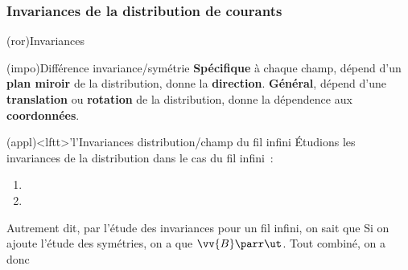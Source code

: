 \documentclass[../../main/main.tex]{subfiles}
\begin{document}
\subsubsection{Invariances de la distribution de courants}
\label{sssec:invdist}
\begin{tcb*}(ror){Invariances}
	\begin{center}
	\end{center}
\end{tcb*}

\begin{tcb*}[sidebyside, sidebyside align=top](impo){Différence invariance/symétrie}
		\textbf{Spécifique} à chaque champ, dépend d'un \textbf{plan miroir} de la
		distribution, donne la \textbf{direction}.
	\tcblower
		\textbf{Général}, dépend d'une \textbf{translation} ou \textbf{rotation} de
		la distribution, donne la dépendence aux \textbf{coordonnées}.
\end{tcb*}

\begin{tcb}(appl)<lftt>'l'{Invariances distribution/champ du fil infini}
  Étudions les invariances de la distribution dans le cas du fil infini~:
	\begin{enumerate}
		\item 
		\item 
	\end{enumerate}
	Autrement dit, par l'étude des invariances pour un fil infini, on
	sait que
	Si on ajoute l'étude des symétries, on a que $\vv{B}\parr \ut$. Tout combiné,
	on a donc
  \psw{%
      \[
      \boxed{\vv{B}(\Mr) = B(r)\ut}
    \]
  }%
  \vspace{-30pt}
\end{tcb}
\end{document}
